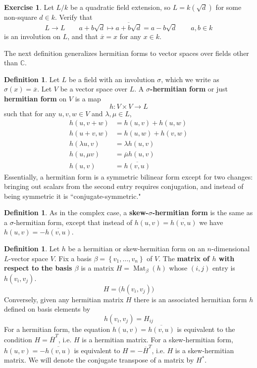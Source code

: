 \documentclass[12pt]{article}
\theoremstyle{definition}
\newtheorem{definition}[theorem]{Definition}
\newtheorem{exercise}[theorem]{Exercise}
\newcommand{\C}{\mathbb{C}}
\newcommand{\sig}{\sigma}
\newcommand{\lam}{\lambda}
\newcommand{\lb}{\left\{}
\newcommand{\rb}{\right\}}
\newcommand{\tbf}{\textbf}
\newcommand{\noi}{\noindent}
\newcommand{\ov}{\overline}
\DeclareMathOperator{\Mat}{Mat}
\begin{document}
\begin{exercise}
Let $L/k$ be a quadratic field extension, so $L = k(\sqrt{d})$ for some non-square $d \in k$. Verify that
\[
	L \to L \qquad a+b \sqrt{d} \mapsto \ov{a+b\sqrt{d}} = a - b \sqrt{d} \qquad a,b \in k
\]
is an involution on $L$, and that $\ov x = x$ for any $x \in k$.
\end{exercise}

\noi The next definition generalizes hermitian forms to vector spaces over fields other than $\C$.

\begin{definition}
Let $L$ be a field with an involution $\sig$, which we write as $\sig(x) = \ov x$. Let $V$ be a vector space over $L$. A \tbf{$\sig$-hermitian form} or just \tbf{hermitian form} on $V$ is a map
\[
	h:V \times V \to L
\]
such that for any $u,v, w \in V$ and $\lam, \mu \in L$, 
\begin{align*}
	h(u, v+w) &= h(u, v) + h(u,w) \\
	h(u+v, w) &= h(u,w) + h(v,w) \\
	h( \lam u, v) &= \lam h(u,v) \\
	h( u, \mu v) &= \ov \mu h(u,v) \\
	h(u,v) &= \ov{h(v,u)}
\end{align*}
Essentially, a hermitian form is a symmetric bilinear form except for two changes: bringing out scalars from the second entry requires conjugation, and instead of being symmetric it is ``conjugate-symmetric."
\end{definition}

\begin{definition}
As in the complex case, a \tbf{skew-$\sig$-hermitian form} is the same as a $\sig$-hermitian form, except that instead of $h(u,v) = \ov{h(v,u)}$ we have $h(u,v) = - \ov{h(v,u)}$.
\end{definition}

\begin{definition}
Let $h$ be a hermitian or skew-hermitian form on an $n$-dimensional $L$-vector space $V$. Fix a basis $\beta = \lb v_1, \ldots, v_n \rb$ of $V$. The \tbf{matrix of $h$ with respect to the basis $\beta$} is a matrix $H = \Mat_\beta(h)$ whose $(i,j)$ entry is $h(v_i, v_j)$.
\[
	H = \big( h(v_i, v_j) \big)
\]
Conversely, given any hermitian matrix $H$ there is an associated hermitian form $h$ defined on basis elements by
\[
	h(v_i, v_j) = H_{ij}
\]
For a hermitian form, the equation $h(u,v) = \ov{h(v,u)}$ is equivalent to the condition $H = \ov H^T$, i.e. $H$ is a hermitian matrix. For a skew-hermitian form, $h(u,v) = - \ov{h(v,u)}$ is equivalent to $H = - \ov H^T$, i.e. $H$ is a skew-hermitian matrix. We will denote the conjugate transpose of a matrix by $H^*$. 
\end{definition}
\end{document}
